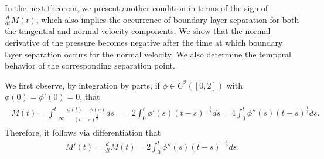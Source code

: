 \documentclass{amsart}
\numberwithin{equation}{section}
\begin{document}
In the next theorem, we present another condition in terms of the sign of $\frac{d}{dt}M(t)$, which also implies the occurrence of boundary layer separation for both the tangential and normal velocity components. We show that the normal derivative of the pressure becomes negative after the time at which boundary layer separation occurs for the normal velocity. We also determine the temporal behavior of the corresponding separation point.

We first observe, by integration by parts, if  $ \phi \in C^2([0,2])$ with  $\phi(0) =\phi'(0)  =0$, that
\begin{align}\label{1026-6-1}
\begin{split}
M(t) = \int_{-\infty}^t  \frac{  \phi(t) - \phi(s)  }{(t-s)^\frac32}  ds  
& =   2\int_{0}^t   \phi' (s)     (t-s)^{-\frac12}  ds 
 =    4\int_{0}^t   \phi'' (s)   (t-s)^{\frac12}  ds.
\end{split}
\end{align}
Therefore, it follows via differentiation that   
\begin{align}\label{M-prime}
M'(t) = \frac{d}{dt} M(t) =2 \int_0^t  \phi''(s) (t-s)^{-\frac12}  ds.
\end{align}
\end{document}
